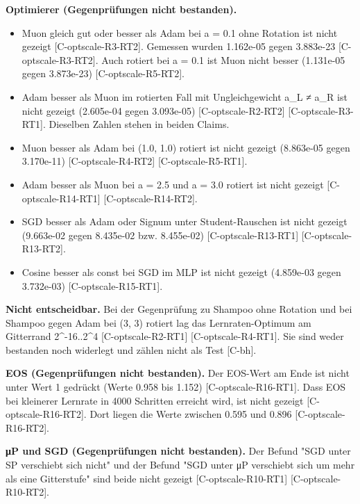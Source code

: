 \documentclass[10pt,twocolumn]{article}
\begin{document}
\textbf{Optimierer (Gegenprüfungen nicht bestanden).}
\begin{itemize}
\item Muon gleich gut oder besser als Adam bei a = 0.1 ohne Rotation ist nicht gezeigt {\scriptsize[C-optscale-R3-RT2]}. Gemessen wurden 1.162e-05 gegen 3.883e-23 {\scriptsize[C-optscale-R3-RT2]}. Auch rotiert bei a = 0.1 ist Muon nicht besser (1.131e-05 gegen 3.873e-23) {\scriptsize[C-optscale-R5-RT2]}.
\item Adam besser als Muon im rotierten Fall mit Ungleichgewicht a_L ≠ a_R ist nicht gezeigt (2.605e-04 gegen 3.093e-05) {\scriptsize[C-optscale-R2-RT2]} {\scriptsize[C-optscale-R3-RT1]}. Dieselben Zahlen stehen in beiden Claims.
\item Muon besser als Adam bei (1.0, 1.0) rotiert ist nicht gezeigt (8.863e-05 gegen 3.170e-11) {\scriptsize[C-optscale-R4-RT2]} {\scriptsize[C-optscale-R5-RT1]}.
\item Adam besser als Muon bei a = 2.5 und a = 3.0 rotiert ist nicht gezeigt {\scriptsize[C-optscale-R14-RT1]} {\scriptsize[C-optscale-R14-RT2]}.
\item SGD besser als Adam oder Signum unter Student-Rauschen ist nicht gezeigt (9.663e-02 gegen 8.435e-02 bzw. 8.455e-02) {\scriptsize[C-optscale-R13-RT1]} {\scriptsize[C-optscale-R13-RT2]}.
\item Cosine besser als const bei SGD im MLP ist nicht gezeigt (4.859e-03 gegen 3.732e-03) {\scriptsize[C-optscale-R15-RT1]}.
\end{itemize}

\textbf{Nicht entscheidbar.} Bei der Gegenprüfung zu Shampoo ohne Rotation und bei Shampoo gegen Adam bei (3, 3) rotiert lag das Lernraten-Optimum am Gitterrand 2^-16..2^4 {\scriptsize[C-optscale-R2-RT1]} {\scriptsize[C-optscale-R4-RT1]}. Sie sind weder bestanden noch widerlegt und zählen nicht als Test {\scriptsize[C-bh]}.

\textbf{EOS (Gegenprüfungen nicht bestanden).} Der EOS-Wert am Ende ist nicht unter Wert 1 gedrückt (Werte 0.958 bis 1.152) {\scriptsize[C-optscale-R16-RT1]}. Dass EOS bei kleinerer Lernrate in 4000 Schritten erreicht wird, ist nicht gezeigt {\scriptsize[C-optscale-R16-RT2]}. Dort liegen die Werte zwischen 0.595 und 0.896 {\scriptsize[C-optscale-R16-RT2]}.

\textbf{μP und SGD (Gegenprüfungen nicht bestanden).} Der Befund "SGD unter SP verschiebt sich nicht" und der Befund "SGD unter μP verschiebt sich um mehr als eine Gitterstufe" sind beide nicht gezeigt {\scriptsize[C-optscale-R10-RT1]} {\scriptsize[C-optscale-R10-RT2]}.
\end{document}
